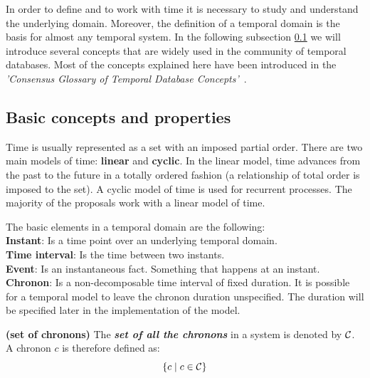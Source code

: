 %
%
In order to define and to work with time it is necessary to study and understand the underlying domain. Moreover, the definition of a temporal domain is the basis for almost any temporal system. In the following subsection \ref{subsec:basic-concepts} we will introduce several concepts that are widely used in the community of temporal databases. Most of the concepts explained here have been introduced in the \emph{'Consensus Glossary of Temporal Database Concepts'}~\cite{Dyreson1994}.



\subsection{Basic concepts and properties}
\label{subsec:basic-concepts}

Time is usually represented as a set with an imposed partial order. There are two main models of time: \textbf{linear} and \textbf{cyclic}. In the linear model, time advances from the past to the future in a totally ordered fashion (a relationship of total order is imposed to the set). A cyclic model of time is used for recurrent processes. The majority of the proposals work with a linear model of time.

\begin{svgraybox}
The basic elements in a temporal domain are the following:\\
\textbf{Instant}:  Is a time point over an underlying temporal domain.\\
\textbf{Time interval}: Is the time between two instants.\\
\textbf{Event}: Is an instantaneous fact. Something that happens at an instant.\\
\textbf{Chronon}: Is a non-decomposable time interval of fixed duration. It is possible for a temporal model to leave the chronon duration unspecified. The duration will be specified later in the implementation of the model.
\end{svgraybox}

\begin{definition}\textbf{(set of chronons)}
\label{def:set-chronon}
The \textbf{\emph{set of all the chronons}} in a system is denoted by $\mathcal{C}$. A chronon $c$ is therefore defined as:
\begin{equation}
\left \lbrace c \mid c \in \mathcal{C} \right \rbrace
\end{equation}
\end{definition}

